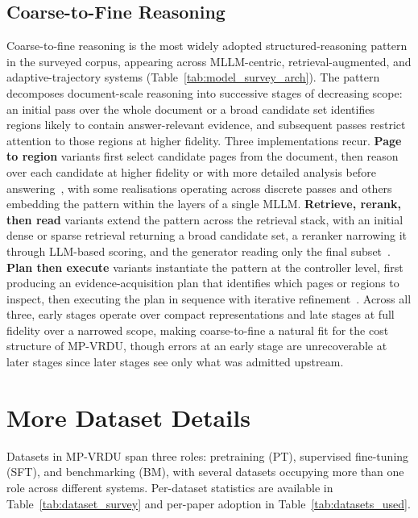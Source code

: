 \documentclass[11pt]{article}
\begin{document}
\subsection{Coarse-to-Fine Reasoning}
\label{app:coarse-to-fine}
Coarse-to-fine reasoning is the most widely adopted structured-reasoning pattern in the surveyed corpus, appearing across MLLM-centric, retrieval-augmented, and adaptive-trajectory systems (Table~\ref{tab:model_survey_arch}). The pattern decomposes document-scale reasoning into successive stages of decreasing scope: an initial pass over the whole document or a broad candidate set identifies regions likely to contain answer-relevant evidence, and subsequent passes restrict attention to those regions at higher fidelity. Three implementations recur. \textbf{Page to region} variants first select candidate pages from the document, then reason over each candidate at higher fidelity or with more detailed analysis before answering~\cite{shi2026urag, xiong2026docr1, yan2025docseeker, gong2025mhier}, with some realisations operating across discrete passes and others embedding the pattern within the layers of a single MLLM. \textbf{Retrieve, rerank, then read} variants extend the pattern across the retrieval stack, with an initial dense or sparse retrieval returning a broad candidate set, a reranker narrowing it through LLM-based scoring, and the generator reading only the final subset~\cite{zhang2024cream, xu2026mmr5, shin2025multidocfusion, zhang2026mldocrag}. \textbf{Plan then execute} variants instantiate the pattern at the controller level, first producing an evidence-acquisition plan that identifies which pages or regions to inspect, then executing the plan in sequence with iterative refinement~\cite{zheng2026docvstar, sun2025docagent, fu2026dmap}. Across all three, early stages operate over compact representations and late stages at full fidelity over a narrowed scope, making coarse-to-fine a natural fit for the cost structure of MP-VRDU, though errors at an early stage are unrecoverable at later stages since later stages see only what was admitted upstream.

\section{More Dataset Details}
\label{app:dataset-details}
Datasets in MP-VRDU span three roles: pretraining (PT), supervised fine-tuning (SFT), and benchmarking (BM), with several datasets occupying more than one role across different systems. Per-dataset statistics are available in Table~\ref{tab:dataset_survey} and per-paper adoption in Table~\ref{tab:datasets_used}.
\end{document}
